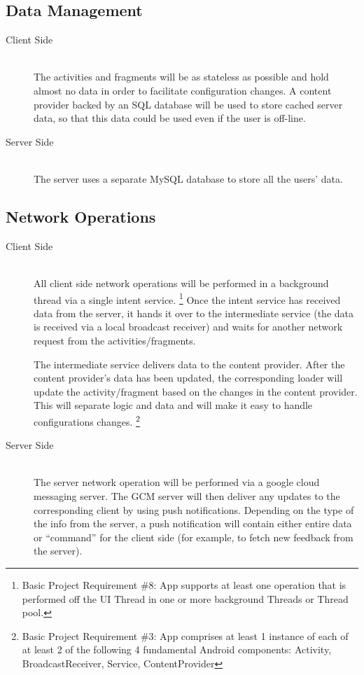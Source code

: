 \documentclass{article}
\begin{document}
    \subsection{Data Management}

    \begin{description}
        \item[Client Side] \hfill \\
            The activities and fragments will be as stateless as possible and hold almost no data in order to facilitate configuration changes. A content provider backed by an SQL database will be used to store cached server data, so that this data could be used even if the user is off-line.
        \item[Server Side] \hfill \\
            The server uses a separate MySQL database to store all the users' data.
    \end{description}

    \subsection{Network Operations}

    \begin{description}
        \item[Client Side] \hfill \\
        All client side network operations will be performed in a background thread via a single intent service.
        \footnote{Basic Project Requirement \#8: App supports at least one operation that is performed off the UI Thread in one or more background Threads or Thread pool.}
        Once the intent service has received data from the server, it hands it over to the intermediate service (the data is received via a local broadcast receiver) and waits for another network request from the activities/fragments.
        
        The intermediate service delivers data to the content provider. After the content provider's data has been updated, the corresponding loader will update the activity/fragment based on the changes in the content provider. This will separate logic and data and will make it easy to handle configurations changes.
        \footnote{Basic Project Requirement \#3: App comprises at least 1 instance of each of at least 2 of the following 4 fundamental Android components: Activity, BroadcastReceiver, Service, ContentProvider}
        \item[Server Side] \hfill \\
            The server network operation will be performed via a google cloud messaging server. The GCM server will then deliver any updates to the corresponding client by using push notifications. Depending on the type of the info from the server, a push notification will contain either entire data or ``command'' for the client side (for example, to fetch new feedback from the server).
    \end{description}
\end{document}
